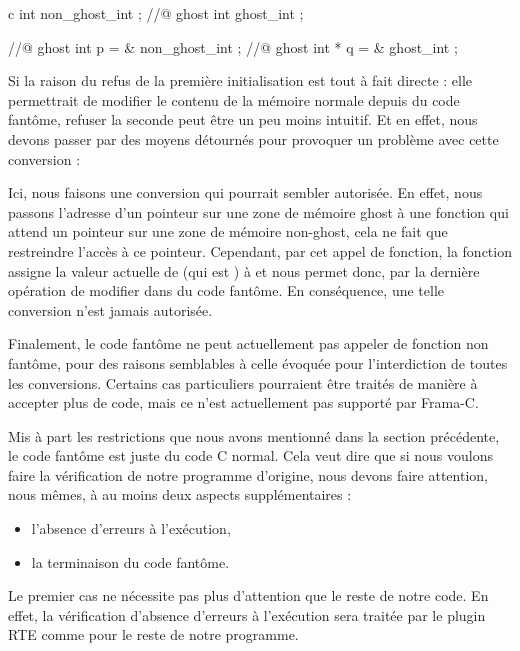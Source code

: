 \begin{CodeBlock}{c}
int non_ghost_int ;
//@ ghost int ghost_int ;

//@ ghost int \ghost * p = & non_ghost_int ;
//@ ghost int * q = & ghost_int ;
\end{CodeBlock}


Si la raison du refus de la première initialisation est tout à fait directe : elle
permettrait de modifier le contenu de la mémoire normale depuis du code fantôme,
refuser la seconde peut être un peu moins intuitif. Et en effet, nous devons passer
par des moyens détournés pour provoquer un problème avec cette conversion :




Ici, nous faisons une conversion qui pourrait sembler autorisée. En effet, nous
passons l'adresse d'un pointeur sur une zone de mémoire ghost à une fonction qui
attend un pointeur sur une zone de mémoire non-ghost, cela ne fait que restreindre
l'accès à ce pointeur. Cependant, par cet appel de fonction, la fonction
 assigne la valeur actuelle de  (qui est
) à  et nous permet donc, par la dernière opération
de modifier  dans du code fantôme. En conséquence, une telle
conversion n'est jamais autorisée.


Finalement, le code fantôme ne peut actuellement pas appeler de fonction non
fantôme, pour des raisons semblables à celle évoquée pour l'interdiction de toutes
les conversions. Certains cas particuliers pourraient être traités de manière à
accepter plus de code, mais ce n'est actuellement pas supporté par Frama-C.


\label{l3:acsl-logic-definitions-what-remains}


Mis à part les restrictions que nous avons mentionné dans la section précédente,
le code fantôme est juste du code C normal. Cela veut dire que si nous voulons
faire la vérification de notre programme d'origine, nous devons faire attention,
nous mêmes, à au moins deux aspects supplémentaires :


\begin{itemize}
\item l'absence d'erreurs à l'exécution,
\item la terminaison du code fantôme.
\end{itemize}


Le premier cas ne nécessite pas plus d'attention que le reste de notre code.
En effet, la vérification d'absence d'erreurs à l'exécution sera traitée par
le plugin RTE comme pour le reste de notre programme.


